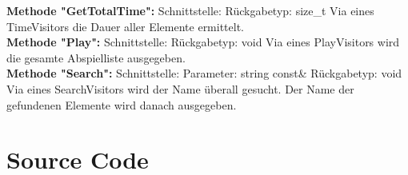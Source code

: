 \documentclass[12pt,a4paper]{article}
\begin{document}
\textbf {Methode "GetTotalTime": } 
\newline
Schnittstelle: 
\newline
Rückgabetyp: size\_t
\newline
Via eines TimeVisitors die Dauer aller Elemente ermittelt.
\\

\textbf {Methode "Play": } 
\newline
Schnittstelle: 
\newline
Rückgabetyp: void
\newline
Via eines PlayVisitors wird die gesamte Abspielliste ausgegeben.
\\

\textbf {Methode "Search": } 
\newline
Schnittstelle: 
\newline
Parameter: string const\&
\newline
Rückgabetyp: void
\newline
Via eines SearchVisitors wird der Name überall gesucht. Der Name der gefundenen Elemente wird danach ausgegeben.
\\

\newpage
\section {Source Code}



\newpage


\newpage


\newpage

\newpage


\newpage

\newpage


\newpage

\newpage


\newpage

\newpage


\newpage

\newpage


\newpage
\end{document}
